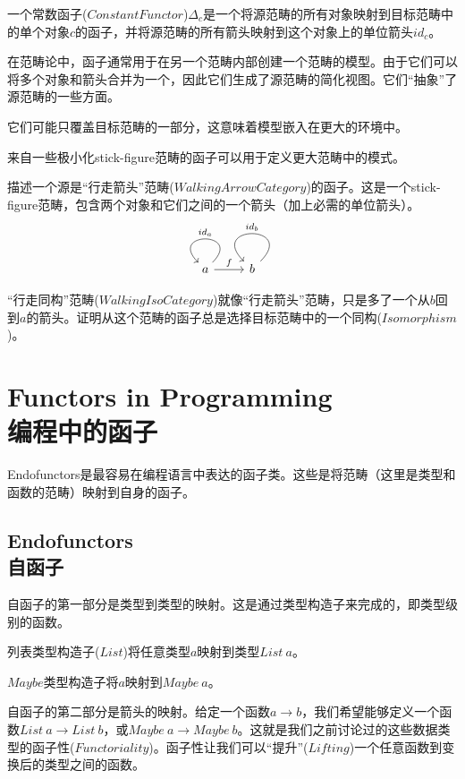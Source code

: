 \documentclass[DaoFP]{subfiles}
\begin{document}
    一个常数函子($Constant Functor$)$\Delta_c$是一个将源范畴的所有对象映射到目标范畴中的单个对象$c$的函子，并将源范畴的所有箭头映射到这个对象上的单位箭头$id_c$。

    在范畴论中，函子通常用于在另一个范畴内部创建一个范畴的模型。由于它们可以将多个对象和箭头合并为一个，因此它们生成了源范畴的简化视图。它们“抽象”了源范畴的一些方面。

    它们可能只覆盖目标范畴的一部分，这意味着模型嵌入在更大的环境中。

    来自一些极小化stick-figure范畴的函子可以用于定义更大范畴中的模式。

    \begin{exercise}
        描述一个源是“行走箭头”范畴($Walking Arrow Category$)的函子。这是一个stick-figure范畴，包含两个对象和它们之间的一个箭头（加上必需的单位箭头）。
        \[
            \begin{tikzcd}
                a
                \arrow[loop,  "id_{a}"']
                \arrow[r, "f"]
                & b
                \arrow[loop, "id_{b}"']
            \end{tikzcd}
        \]
    \end{exercise}
    \begin{exercise}
        “行走同构”范畴($Walking Iso Category$)就像“行走箭头”范畴，只是多了一个从$b$回到$a$的箭头。证明从这个范畴的函子总是选择目标范畴中的一个同构($Isomorphism$)。
    \end{exercise}

    \section{Functors in Programming\\编程中的函子}

    Endofunctors是最容易在编程语言中表达的函子类。这些是将范畴（这里是类型和函数的范畴）映射到自身的函子。

    \subsection{Endofunctors\\自函子}

    自函子的第一部分是类型到类型的映射。这是通过类型构造子来完成的，即类型级别的函数。

    列表类型构造子($List$)将任意类型$a$映射到类型$List\ a$。

    $Maybe$类型构造子将$a$映射到$Maybe\ a$。

    自函子的第二部分是箭头的映射。给定一个函数$a \to b$，我们希望能够定义一个函数$List\ a \to List\ b$，或$Maybe\ a \to Maybe\ b$。这就是我们之前讨论过的这些数据类型的函子性($Functoriality$)。函子性让我们可以“提升”($Lifting$)一个任意函数到变换后的类型之间的函数。
\end{document}
